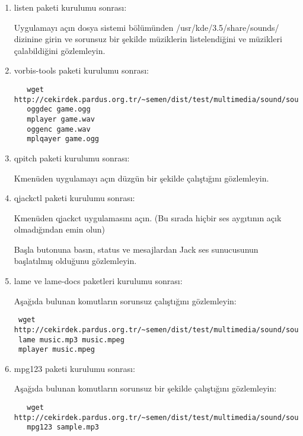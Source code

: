 \documentclass[a4paper,10pt]{article}
\begin{document}
\begin{enumerate}
\item listen paketi kurulumu sonrası: 

Uygulamayı açın dosya sistemi bölümünden /usr/kde/3.5/share/sounds/ dizinine girin ve sorunsuz bir şekilde müziklerin listelendiğini ve müzikleri çalabildiğini gözlemleyin.

\item vorbis-tools paketi kurulumu sonrası: 
 \begin{verbatim}
   wget http://cekirdek.pardus.org.tr/~semen/dist/test/multimedia/sound/sound/sample.ogg
   oggdec game.ogg
   mplayer game.wav
   oggenc game.wav
   mplqayer game.ogg
 \end{verbatim}

\item qpitch paketi kurulumu sonrası:

Kmenüden uygulamayı açın düzgün bir şekilde çalıştığını gözlemleyin.

\item qjackctl paketi kurulumu sonrası: 

Kmenüden qjackct uygulamasını açın. (Bu sırada hiçbir ses aygıtının açık olmadığından emin olun)

Başla butonuna basın, status ve mesajlardan Jack ses sunucusunun başlatılmış olduğunu gözlemleyin.

\item lame ve lame-docs paketleri kurulumu sonrası: 

Aşağıda bulunan komutların sorunsuz çalıştığını gözlemleyin:
\begin{verbatim}
 wget http://cekirdek.pardus.org.tr/~semen/dist/test/multimedia/sound/sound/sample.mp3
 lame music.mp3 music.mpeg
 mplayer music.mpeg
\end{verbatim}

\item mpg123 paketi kurulumu sonrası:

Aşağıda bulunan komutların sorunsuz bir şekilde çalıştığını gözlemleyin:
 \begin{verbatim}
   wget http://cekirdek.pardus.org.tr/~semen/dist/test/multimedia/sound/sound/sample.mp3
   mpg123 sample.mp3
 \end{verbatim}

\end{enumerate}
\end{document}
